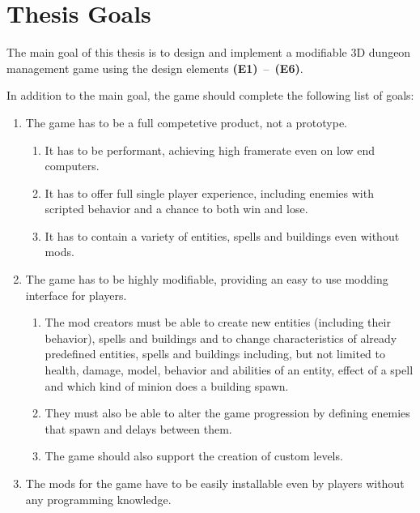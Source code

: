 \section{Thesis Goals}

The main goal of this thesis is to design and implement a modifiable 3D dungeon management game using the design elements \textbf{(E1)}~--~\textbf{(E6)}.

In addition to the main goal, the game should complete the following list of goals:

\begin{enumerate}[label=\textbf{(G\arabic*)}]
    \item The game has to be a full competetive product, not a prototype.
        \begin{enumerate}[label=\textbf{(G1.\arabic*)}]
            \item It has to be performant, achieving high framerate even on low end computers.
            \item It has to offer full single player experience, including enemies with scripted behavior and a chance to both win and lose.
            \item It has to contain a variety of entities, spells and buildings even without mods.
        \end{enumerate}
    \item The game has to be highly modifiable, providing an easy to use modding interface for players.
        \begin{enumerate}[label=\textbf{(G2.\arabic*)}]
            \item The mod creators must be able to create new entities (including their behavior), spells and buildings and to 
                change characteristics of already predefined entities, spells and buildings including, but not limited to
                health, damage, model, behavior and abilities of an entity, effect of a spell  and which kind of minion does a building spawn.
            \item They must also be able to alter the game progression by defining enemies that spawn and delays between them.
            \item The game should also support the creation of custom levels.
        \end{enumerate}
    \item The mods for the game have to be easily installable even by players without any programming knowledge. 
\end{enumerate}
